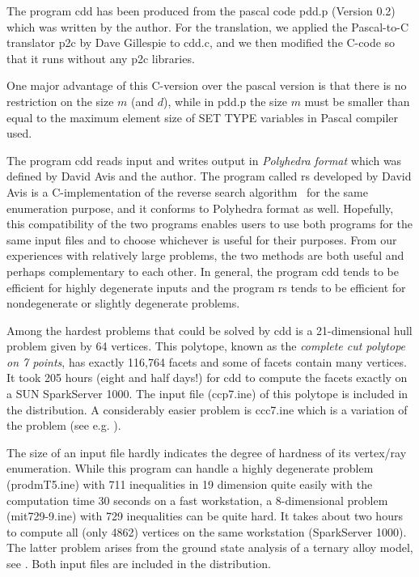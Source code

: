The program cdd has been produced
from the pascal code pdd.p (Version 0.2)
which was written by the author.   For the translation,
we applied the Pascal-to-C translator p2c
by Dave Gillespie to cdd.c, and we then modified
the C-code so that it runs without any p2c libraries.

One major advantage of this C-version over the pascal version is
that there is no restriction on the size  $m$ (and $d$), while in pdd.p
the size $m$ must be smaller than equal to the maximum element size
of SET TYPE variables in Pascal compiler used.

The program cdd reads input and writes output in 
{\em Polyhedra format\/} which was defined by David Avis and
the author.  The program called rs developed by David Avis is
a C-implementation of the reverse search algorithm~\cite{AF} 
for the same enumeration purpose, and it conforms to Polyhedra format as well.
Hopefully, this compatibility of the two programs
enables users to use both programs for the same input files
and to choose whichever is useful for their purposes.
From our experiences with relatively large problems,
the two methods are both useful and perhaps complementary
to each other.  In general, the program cdd tends to be
efficient for highly degenerate inputs and the program rs
tends to be efficient for nondegenerate or slightly
degenerate problems.

Among the hardest problems that could be
solved by cdd is a 21-dimensional hull problem given by 64 
vertices. This polytope, known as the {\em complete
cut polytope on 7 points\/}, has exactly 116,764 facets
and some of facets contain many vertices. 
It took 205 hours (eight and half days!) for cdd
to compute the facets exactly on a SUN SparkServer 1000.
The input file (ccp7.ine) of this polytope is
included in the distribution.  A considerably easier
problem is ccc7.ine which is a variation of the problem 
(see e.g. \cite{G}).

The size of an input file hardly indicates the degree of 
hardness of its vertex/ray enumeration.  While this program
can handle a highly degenerate problem (prodmT5.ine) with 
711 inequalities in  19 dimension quite easily with
the computation time 30 seconds on a fast workstation, 
a 8-dimensional problem (mit729-9.ine) with 729 inequalities
can be quite hard.  It takes about two hours to compute all
(only 4862) vertices on the same workstation (SparkServer 1000).
The latter problem arises
from the ground state analysis of a ternary alloy model, see \cite{CGAF}.
Both input files are included in the distribution.  


